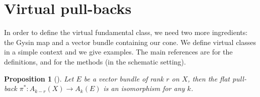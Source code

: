 \documentclass[pdftex]{sigma}
\numberwithin{equation}{section}
\newtheorem{Proposition}[Theorem]{Proposition}
 { \theoremstyle{definition}
\newtheorem{Definition}[Theorem]{Definition}
\newtheorem{Note}[Theorem]{Note}
\newtheorem{Example}[Theorem]{Example}
\newtheorem{Remark}[Theorem]{Remark}
\newtheorem{notation}[Theorem]{Notation}
\newtheorem{construction}[Theorem]{Construction}
}
\theoremstyle{plain}
\theoremstyle{definition}
\theoremstyle{remark}
\begin{document}
\section{Virtual pull-backs}\label{gysinmorphism}
In order to define the virtual fundamental class, we need two more ingredients: the Gysin map and a vector bundle containing our cone. We define virtual classes in a simple context and we give examples. The main references are \cite{vir-pull} for the definitions, and \cite[Chapters 5 and 6]{Fulton} for the methods (in the schematic setting).

\begin{Proposition}[{{\cite[Theorem 3.3]{Fulton}}}] Let $E$ be a vector bundle of rank $r$ on $X$, then
the flat pull-back $\pi^*\colon A_{k-r}(X)\to A_k(E)$ is an isomorphism for any $k$.
\end{Proposition}
\end{document}
